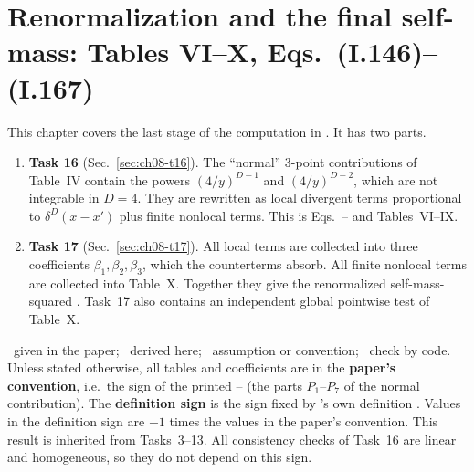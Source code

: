 \providecommand{\chEres}{\operatorname{Res}}
\providecommand{\chEok}{\ensuremath{\checkmark}}
\providecommand{\chEbad}{\ensuremath{\boldsymbol{\times}}}
\providecommand{\chECd}{C_{\delta}}

\chapter{Renormalization and the final self-mass: Tables VI--X, Eqs.~(I.146)--(I.167)}
\label{ch:ch08}

This chapter covers the last stage of the computation in \PI. It has two parts.
\begin{enumerate}[leftmargin=*,itemsep=1pt]
\item \textbf{Task 16} (Sec.~\ref{sec:ch08-t16}). The ``normal'' 3-point contributions of Table~IV contain the powers
$(4/y)^{D-1}$ and $(4/y)^{D-2}$, which are not integrable in $D=4$. They are rewritten as local divergent terms
proportional to $\delta^D(x-x')$ plus finite nonlocal terms. This is Eqs.~-- and Tables~VI--IX.
\item \textbf{Task 17} (Sec.~\ref{sec:ch08-t17}). All local terms are collected into three coefficients $\beta_1,\beta_2,\beta_3$, which the counterterms absorb.
All finite nonlocal terms are collected into Table~X. Together they give the renormalized self-mass-squared .
Task~17 also contains an independent global pointwise test of Table~X.
\end{enumerate}

\begin{notebox}
\tP\ given in the paper; \tD\ derived here; \tA\ assumption or convention; \tC\ check by code.
Unless stated otherwise, all tables and coefficients are in the \textbf{paper's convention}, i.e.\ the sign of the printed
-- (the parts $P_1$--$P_7$ of the normal contribution).
The \textbf{definition sign} is the sign fixed by \PI's own definition . Values in the definition sign are $-1$ times the values in the paper's convention.
This result is inherited from Tasks~3--13. All consistency checks of Task~16 are linear and homogeneous, so they do not depend on this sign.
\end{notebox}

